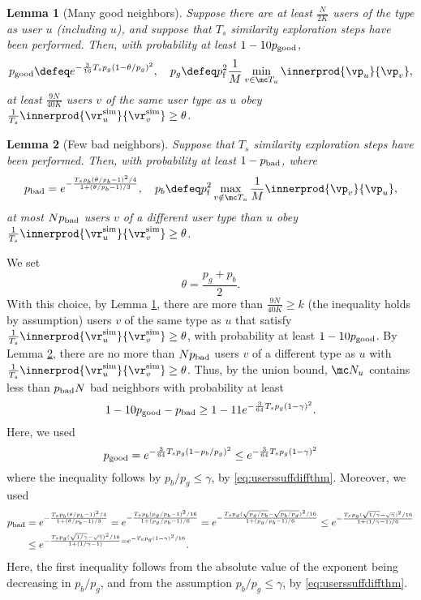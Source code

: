 \documentclass{article}
\newtheorem{lemma}{Lemma}
\newcommand\pf{p_{\mathrm{f}}}
\newcommand{\vratingS}{\vocrating^{\text{sim}}}
\newcommand\vocrating{\vr}
\begin{document}
\begin{lemma}[Many good neighbors]
Suppose there are at least $\frac{N}{2K}$ users of the type as user $u$ (including $u$), and suppose 
that $T_s$ similarity exploration steps have been performed. 
Then, with probability
at least $1-10p_{\mathrm{good}}$, 
\[
\perrg \defeq 
e^{  - \frac{3}{ 16 }  T_s  p_g(1-\theta/p_g)^2  },  \quad p_g \defeq \pf^2 \frac{1}{M}  \min_{v\in \mc T_u} \innerprod{\vp_u}{\vp_v}, 
\]
at least $\frac{9 N}{40 K}$ users $v$ of the same user type as $u$ obey $\frac{1}{T_s} \innerprod{\vratingS_u }{\vratingS_v} \geq \theta$. 
\label{lem:manygood}
\end{lemma}
\begin{lemma}[Few bad neighbors]
Suppose that $T_s$ similarity exploration steps have been performed. 
Then, with probability at least $1 -  p_{\mathrm{bad}}$, where 
\[
\perrb = 
e^{ - 
\frac{T_s p_b (\theta/p_b - 1)^2 /4}{ 1 + (\theta/p_b - 1)/3 } 
}, \quad 
p_b \defeq \pf^2 \max_{v \notin \mc T_u} \frac{1}{M} \innerprod{\vp_v}{\vp_u}, 
\]
at most $N p_{\mathrm{bad}}$ users $v$ of a different user type than $u$ obey $\frac{1}{T_s} \innerprod{\vratingS_u }{\vratingS_v} \geq \theta $. 
\label{lem:fewbad}
\end{lemma}


We set %
\[
\theta = \frac{p_g + p_b}{2}.
\]
With this choice, by Lemma \ref{lem:manygood}, there are more than $\frac{9N}{40K} \geq k$ (the inequality holds by assumption) 
users $v$ of the same type as $u$ that satisfy 
$
\frac{1}{T_s}\innerprod{\vratingS_u}{\vratingS_v} \geq \theta
$, with probability at least $1- 10p_{\mathrm{good}}$. 
By Lemma \ref{lem:fewbad}, there are no more than $Np_{\mathrm{bad}}$ users $v$ of a different type as $u$ with $
\frac{1}{T_s}\innerprod{\vratingS_u}{\vratingS_v} \geq \theta
$. 
Thus, by the union bound, $\mc N_u$ contains less than $p_{\mathrm{bad}} N$ bad neighbors with probability at least 
\[
1- 10p_{\mathrm{good}} - p_{\mathrm{bad}} \geq 1 - 11 e^{ - \frac{3}{ 64 }  T_s  p_g(1-\gamma)^2 }.
\]
Here, we used 
\[
p_{\mathrm{good}}
=
e^{ - \frac{3}{ 64 }  T_s  p_g(1-p_b/p_g)^2 }
\leq e^{ - \frac{3}{ 64 }  T_s  p_g(1-\gamma)^2 }
\]
where the inequality follows by $p_b/p_g \leq \gamma$, by \eqref{eq:userssuffdiffthm}. 
Moreover, we used 
\begin{align}
\perrb 
&= 
e^{ - 
\frac{T_s p_b ( \theta/p_b - 1)^2 /4}{ 1 + (\theta/p_b - 1)/3 } 
}
=
e^{ - 
\frac{T_s p_b ( p_g/p_b - 1)^2 /16}{ 1 + (p_g/p_b - 1)/6 } 
}
%
=
e^{ - 
\frac{T_s p_g ( \sqrt{p_g/p_b} - \sqrt{p_b/p_g} )^2 /16}{ 1 + (p_g/p_b - 1)/6 } 
}
%
\leq
e^{ - 
\frac{T_s p_g ( \sqrt{1/\gamma} - \sqrt{\gamma} )^2 /16}{ 1 + (1/\gamma - 1)/6 } 
} \nonumber \\
%
&\leq
e^{ - 
\frac{T_s p_g ( \sqrt{1/\gamma} - \sqrt{\gamma} )^2 /16}{ 1 + (1/\gamma - 1) }
%
= 
e^{ - 
T_s p_g ( 1 - \gamma )^2 /16 } 
}. \label{eq:qdbound}
\end{align}
Here, the first inequality follows from the absolute value of the exponent being decreasing in $p_b/p_g$, and from the assumption $p_b/p_g \leq \gamma$, by \eqref{eq:userssuffdiffthm}. 
\end{document}
